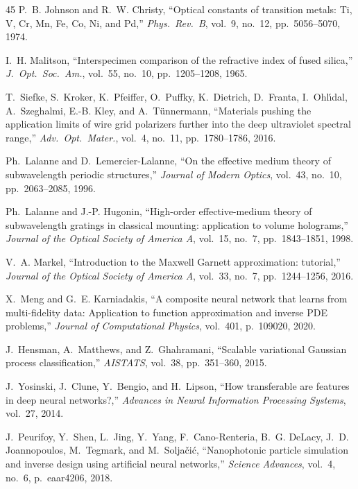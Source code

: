 \documentclass[a4paper,fleqn]{cas-sc}
\begin{document}
\begin{thebibliography}{45}
P.~B. Johnson and R.~W. Christy, ``Optical constants of transition metals: Ti, V, Cr, Mn, Fe, Co, Ni, and Pd,'' \textit{Phys.~Rev.~B}, vol.~9, no.~12, pp.~5056--5070, 1974.

I.~H. Malitson, ``Interspecimen comparison of the refractive index of fused silica,'' \textit{J.~Opt.~Soc.~Am.}, vol.~55, no.~10, pp.~1205--1208, 1965.

T.~Siefke, S.~Kroker, K.~Pfeiffer, O.~Puffky, K.~Dietrich, D.~Franta, I.~Ohl{\'\i}dal, A.~Szeghalmi, E.-B. Kley, and A.~T{\"u}nnermann, ``Materials pushing the application limits of wire grid polarizers further into the deep ultraviolet spectral range,'' \textit{Adv.~Opt.~Mater.}, vol.~4, no.~11, pp.~1780--1786, 2016.

Ph.~Lalanne and D.~Lemercier-Lalanne, ``On the effective medium theory of subwavelength periodic structures,'' \textit{Journal of Modern Optics}, vol.~43, no.~10, pp.~2063--2085, 1996.

Ph.~Lalanne and J.-P. Hugonin, ``High-order effective-medium theory of subwavelength gratings in classical mounting: application to volume holograms,'' \textit{Journal of the Optical Society of America A}, vol.~15, no.~7, pp.~1843--1851, 1998.

V.~A. Markel, ``Introduction to the Maxwell Garnett approximation: tutorial,'' \textit{Journal of the Optical Society of America A}, vol.~33, no.~7, pp.~1244--1256, 2016.

X.~Meng and G.~E. Karniadakis, ``A composite neural network that learns from multi-fidelity data: Application to function approximation and inverse PDE problems,'' \textit{Journal of Computational Physics}, vol.~401, p.~109020, 2020.

J.~Hensman, A.~Matthews, and Z.~Ghahramani, ``Scalable variational Gaussian process classification,'' \textit{AISTATS}, vol.~38, pp.~351--360, 2015.

J.~Yosinski, J.~Clune, Y.~Bengio, and H.~Lipson, ``How transferable are features in deep neural networks?,'' \textit{Advances in Neural Information Processing Systems}, vol.~27, 2014.

J.~Peurifoy, Y.~Shen, L.~Jing, Y.~Yang, F.~Cano-Renteria, B.~G. DeLacy, J.~D. Joannopoulos, M.~Tegmark, and M.~Solja\v{c}i\'{c}, ``Nanophotonic particle simulation and inverse design using artificial neural networks,'' \textit{Science Advances}, vol.~4, no.~6, p.~eaar4206, 2018.


\end{thebibliography}
\end{document}
